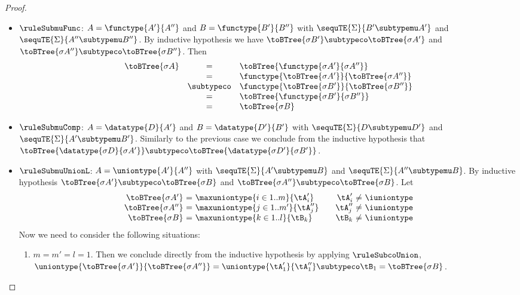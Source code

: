 \begin{proof}
\begin{itemize}
  \item $\ruleSubmuFunc$: $A = \functype{A'}{A''}$ and $B = \functype{B'}{B''}$
  with $\sequTE{\Sigma}{B' \subtypemu A'}$ and $\sequTE{\Sigma}{A'' \subtypemu
  B''}$. By inductive hypothesis we have $\toBTree{\sigma B'} \subtypeco
  \toBTree{\sigma A'}$ and $\toBTree{\sigma A''} \subtypeco \toBTree{\sigma
  B''}$. Then $$
\begin{array}{rcl}
\toBTree{\sigma A} & =          & \toBTree{\functype{\sigma A'}{\sigma A''}} \\
                   & =          & \functype{\toBTree{\sigma A'}}{\toBTree{\sigma A''}} \\
                   & \subtypeco & \functype{\toBTree{\sigma B'}}{\toBTree{\sigma B''}} \\
                   & =          & \toBTree{\functype{\sigma B'}{\sigma B''}} \\
                   & =          & \toBTree{\sigma B}
\end{array} $$
  
  \item $\ruleSubmuComp$: $A = \datatype{D}{A'}$ and $B = \datatype{D'}{B'}$
  with $\sequTE{\Sigma}{D \subtypemu D'}$ and $\sequTE{\Sigma}{A' \subtypemu
  B'}$. Similarly to the previous case we conclude from the inductive
  hypothesis that $\toBTree{\datatype{\sigma D}{\sigma A'}} \subtypeco
  \toBTree{\datatype{\sigma D'}{\sigma B'}}$.
  
  \item $\ruleSubmuUnionL$: $A = \uniontype{A'}{A''}$ with $\sequTE{\Sigma}{A'
  \subtypemu B}$ and $\sequTE{\Sigma}{A'' \subtypemu B}$. By inductive
  hypothesis $\toBTree{\sigma A'} \subtypeco \toBTree{\sigma B}$ and
  $\toBTree{\sigma A''} \subtypeco \toBTree{\sigma B}$. Let $$
\begin{array}{r@{\ =\ }l@{\qquad}r@{\ \neq\ }l}
\toBTree{\sigma A'}  & \maxuniontype{i \in 1..m}{\tA'_i}   & \tA'_i  & \iuniontype \\
\toBTree{\sigma A''} & \maxuniontype{j \in 1..m'}{\tA''_j} & \tA''_j & \iuniontype \\
\toBTree{\sigma B}   & \maxuniontype{k \in 1..l}{\tB_k}    & \tB_k   & \iuniontype
\end{array} $$
Now we need to consider the following situations:
  \begin{enumerate}
    \item $m = m' = l = 1$. Then we conclude directly from the inductive
    hypothesis by applying $\ruleSubcoUnion$,
    $\uniontype{\toBTree{\sigma A'}}{\toBTree{\sigma A''}} =
    \uniontype{\tA'_1}{\tA''_1} \subtypeco \tB_1 = \toBTree{\sigma B}$.
    

\end{enumerate}
\end{itemize}
\end{proof}
